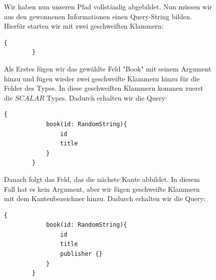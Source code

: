 \begin{figure}[htbp]

    \begin{center}
    \end{center}
    Wir haben nun unseren Pfad vollständig abgebildet.
    Nun müssen wir aus den gewonnenen Informationen einen Query-String bilden.
    Hierfür starten wir mit zwei geschweiften Klammern:
    \begin{lstlisting}[language=GraphQL]
        {
        }
    \end{lstlisting}


    Als Erstes fügen wir das gewählte Feld "Book" mit seinem Argument hinzu und fügen wieder zwei geschweifte Klammern hinzu für die Felder des Types.
    In diese geschweiften Klammern kommen zuerst die $SCALAR$ Types.
    Dadurch erhalten wir die Query:

    \begin{lstlisting}[language=GraphQL]
        {
            book(id: RandomString){
                id
                title
            }
        }
    \end{lstlisting}

    Danach folgt das Feld, das die nächste Kante abbildet.
    In diesem Fall hat es kein Argument, aber wir fügen geschweifte Klammern mit dem Kantenbezeichner hinzu.
    Dadurch erhalten wir die Query:

    \begin{lstlisting}[language=GraphQL]
        {
            book(id: RandomString){
                id
                title
                publisher {}
            }
        }
    \end{lstlisting}



\end{figure}
